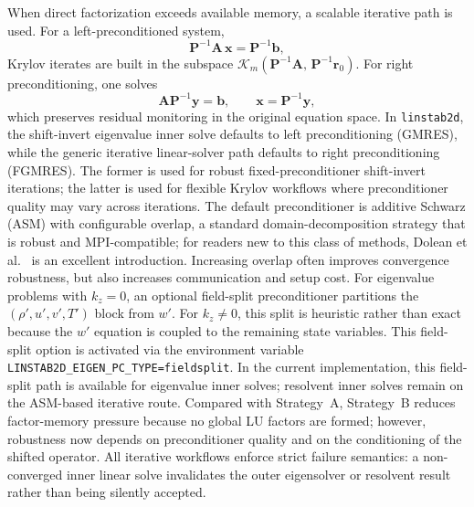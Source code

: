 \documentclass[11pt]{article}
\newcommand{\bx}{\mathbf{x}}
\newcommand{\bA}{\mathbf{A}}
\newcommand{\bP}{\mathbf{P}}
\newcommand{\by}{\mathbf{y}}
\newcommand{\bb}{\mathbf{b}}
\newcommand{\br}{\mathbf{r}}
\begin{document}
When direct factorization exceeds available memory, a scalable iterative path is used.
For a left-preconditioned system,
\begin{equation}
  \bP^{-1}\bA\,\bx = \bP^{-1}\bb,
  \label{eq:preconditioned}
\end{equation}
Krylov iterates are built in the subspace $\mathcal{K}_m(\bP^{-1}\bA,\,\bP^{-1}\br_0)$.
For right preconditioning, one solves
\[
  \bA\bP^{-1}\by = \bb,
  \qquad
  \bx = \bP^{-1}\by,
\]
which preserves residual monitoring in the original equation space.
In \texttt{linstab2d}, the shift-invert eigenvalue inner solve defaults to left preconditioning (GMRES), while the generic iterative linear-solver path defaults to right preconditioning (FGMRES).
The former is used for robust fixed-preconditioner shift-invert iterations; the latter is used for flexible Krylov workflows where preconditioner quality may vary across iterations.
The default preconditioner is additive Schwarz (ASM) with configurable overlap, a standard domain-decomposition strategy that is robust and MPI-compatible; for readers new to this class of methods, Dolean et al.\ \cite{dolean2015introduction} is an excellent introduction.
Increasing overlap often improves convergence robustness, but also increases communication and setup cost.
For eigenvalue problems with $k_z=0$, an optional field-split preconditioner partitions the $(\rho',u',v',T')$ block from $w'$. For $k_z\neq0$, this split is heuristic rather than exact because the $w'$ equation is coupled to the remaining state variables.
This field-split option is activated via the environment variable \texttt{LINSTAB2D\_EIGEN\_PC\_TYPE=fieldsplit}.
In the current implementation, this field-split path is available for eigenvalue inner solves; resolvent inner solves remain on the ASM-based iterative route.
Compared with Strategy~A, Strategy~B reduces factor-memory pressure because no global LU factors are formed; however, robustness now depends on preconditioner quality and on the conditioning of the shifted operator.
All iterative workflows enforce strict failure semantics: a non-converged inner linear solve invalidates the outer eigensolver or resolvent result rather than being silently accepted.
\end{document}
